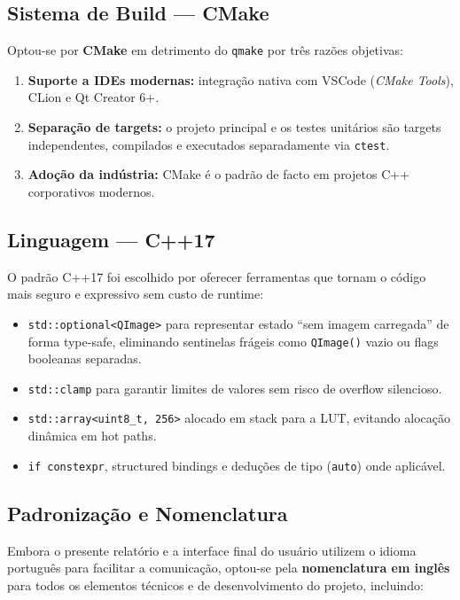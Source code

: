 \documentclass[12pt, a4paper]{article}
\begin{document}
\subsection{Sistema de Build --- CMake}

Optou-se por \textbf{CMake} em detrimento do \texttt{qmake} por três razões
objetivas:

\begin{enumerate}
  \item \textbf{Suporte a IDEs modernas:} integração nativa com VSCode
        (\textit{CMake Tools}), CLion e Qt Creator 6+.
  \item \textbf{Separação de targets:} o projeto principal e os testes
        unitários são targets independentes, compilados e executados
        separadamente via \texttt{ctest}.
  \item \textbf{Adoção da indústria:} CMake é o padrão de facto em projetos
        C++ corporativos modernos.
\end{enumerate}

\subsection{Linguagem --- C++17}

O padrão C++17 foi escolhido por oferecer ferramentas que tornam o código
mais seguro e expressivo sem custo de runtime:

\begin{itemize}
  \item \texttt{std::optional<QImage>} para representar estado ``sem imagem
        carregada'' de forma type-safe, eliminando sentinelas frágeis como
        \texttt{QImage()} vazio ou flags booleanas separadas.
  \item \texttt{std::clamp} para garantir limites de valores sem risco de
        overflow silencioso.
  \item \texttt{std::array<uint8\_t, 256>} alocado em stack para a LUT,
        evitando alocação dinâmica em hot paths.
  \item \texttt{if constexpr}, structured bindings e deduções de tipo
        (\texttt{auto}) onde aplicável.
\end{itemize}

\subsection{Padronização e Nomenclatura}

Embora o presente relatório e a interface final do usuário utilizem o idioma
português para facilitar a comunicação, optou-se pela \textbf{nomenclatura em
inglês} para todos os elementos técnicos e de desenvolvimento do projeto,
incluindo:
\end{document}
